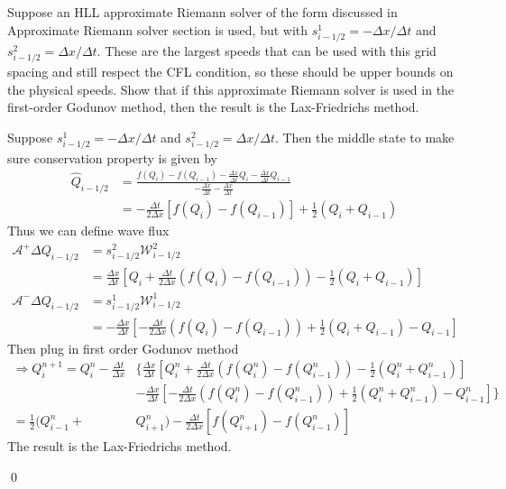 \documentclass[11pt]{article}
\begin{document}
\begin{enumerate}
		Suppose an HLL approximate Riemann solver of the form discussed in Approximate Riemann solver section is used, but with $s_{i-1/2}^1=-\Delta x/\Delta t$ and $s_{i-1/2}^2=\Delta x/\Delta t$. These are the largest speeds that can be used with this grid spacing and still respect the CFL condition, so these should be upper bounds on the physical speeds. Show that if this approximate Riemann solver is used in the first-order Godunov method, then the result is the Lax-Friedrichs method.
				
		
		\vskip 5pt
        \vskip 5pt
        
			Suppose $s_{i-1/2}^1=-\Delta x/\Delta t$ and $s_{i-1/2}^2=\Delta x/\Delta t$. Then the middle state to make sure conservation property is given by
			\begin{align*}
			\hat{Q}_{i-1/2}&=\frac{f(Q_i)-f(Q_{i-1})-\frac{\Delta x}{\Delta t}Q_i-\frac{\Delta x}{\Delta t}Q_{i-1}}{-\frac{\Delta x}{\Delta t}-\frac{\Delta x}{\Delta t}}\\
			&=-\frac{\Delta t}{2\Delta x}[f(Q_i)-f(Q_{i-1})]+\frac{1}{2}(Q_i+Q_{i-1})
			\end{align*}
			Thus we can define wave flux
			\begin{align*}
			\mathcal{A}^+\Delta Q_{i-1/2}&=s^2_{i-1/2}\mathcal{W}^2_{i-1/2}\\
			&=\frac{\Delta x}{\Delta t}[Q_i+\frac{\Delta t}{2\Delta x}(f(Q_i)-f(Q_{i-1}))-\frac{1}{2}(Q_i+Q_{i-1})]\\
			\mathcal{A}^-\Delta Q_{i-1/2}&=s^1_{i-1/2}\mathcal{W}^1_{i-1/2}\\
			&=-\frac{\Delta x}{\Delta t}[-\frac{\Delta t}{2\Delta x}(f(Q_i)-f(Q_{i-1}))+\frac{1}{2}(Q_i+Q_{i-1})-Q_{i-1}]
			\end{align*}
			Then plug in first order Godunov method
			\begin{align*}
			\Rightarrow Q_i^{n+1} = Q_i^n-\frac{\Delta t}{\Delta x}
			&\{
			\frac{\Delta x}{\Delta t}[Q_i^n+\frac{\Delta t}{2\Delta x}(f(Q_i^n)-f(Q_{i-1}^n))-\frac{1}{2}(Q_i^n+Q_{i-1}^n)]\\
			&-\frac{\Delta x}{\Delta t}[-\frac{\Delta t}{2\Delta x}(f(Q_i^n)-f(Q_{i-1}^n))+\frac{1}{2}(Q_i^n+Q_{i-1}^n)-Q_{i-1}^n]
			\}\\
			=\frac{1}{2}(Q_{i-1}^n+&Q_{i+1}^n)-\frac{\Delta t}{2\Delta x}[f(Q_{i+1}^n)-f(Q_{i-1}^n)]
			\end{align*}
			The result is the Lax-Friedrichs method.
        	        	
\qed
\newpage 

\end{enumerate}
\end{document}

